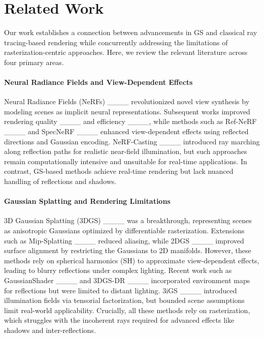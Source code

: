 \section{Related Work}
Our work establishes a connection between advancements in GS and classical ray tracing-based rendering while concurrently addressing the limitations of rasterization-centric approaches. Here, we review the relevant literature across four primary areas.

\paragraph{Neural Radiance Fields and View-Dependent Effects}
Neural Radiance Fields (NeRFs) ____ revolutionized novel view synthesis by modeling scenes as implicit neural representations. Subsequent works improved rendering quality ____ and efficiency ____, while methods such as Ref-NeRF ____ and SpecNeRF ____ enhanced view-dependent effects using reflected directions and Gaussian encoding. NeRF-Casting ____ introduced ray marching along reflection paths for realistic near-field illumination, but such approaches remain computationally intensive and unsuitable for real-time applications. In contrast, GS-based methods achieve real-time rendering but lack nuanced handling of reflections and shadows.

\paragraph{Gaussian Splatting and Rendering Limitations}
3D Gaussian Splatting (3DGS) ____ was a breakthrough, representing scenes as anisot\-ropic Gaussians optimized by differentiable rasterization. Extensions such as Mip-Splatting ____ reduced aliasing, while 2DGS ____ improved surface alignment by restricting the Gaussians to 2D manifolds. However, these methods rely on spherical harmonics (SH) to approximate view-dependent effects, leading to blurry reflections under complex lighting. Recent work such as GaussianShader ____ and 3DGS-DR ____ incorporated environment maps for reflections but were limited to distant lighting. 3iGS ____ introduced illumination fields via tensorial factorization, but bounded scene assumptions limit real-world applicability. Crucially, all these methods rely on rasterization, which struggles with the incoherent rays required for advanced effects like shadows and inter-reflections.

